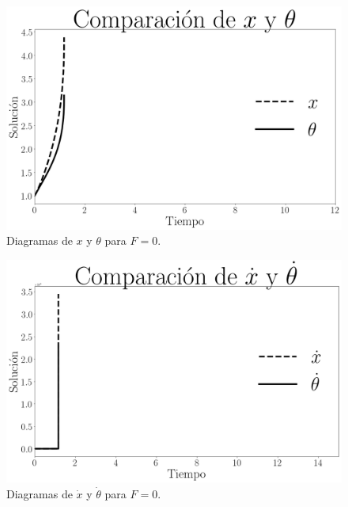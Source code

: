 \documentclass[12pt,letterpaper]{article}
\begin{document}
\begin{figure}[h]
 \centering
 \includegraphics[scale=0.4]{img/sp_x_theta_f0.png}
 \caption{Diagramas de $x$ y $\theta$ para $F=0$.}
 \label{fig: sp x theta force 0}
\end{figure}

\begin{figure}[h]
 \centering
 \includegraphics[scale=0.4]{img/sp_dx_dtheta_f0.png}
 \caption{Diagramas de $\dot{x}$ y $\dot{\theta}$ para $F=0$.}
 \label{fig: sp dx dtheta force 0}
\end{figure}
\end{document}
